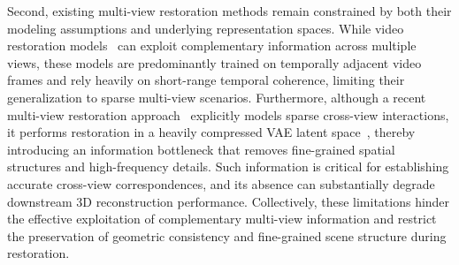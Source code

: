 \documentclass{llmxive}
\begin{document}
Second, existing multi-view restoration methods remain constrained by both their modeling assumptions and underlying representation spaces. While video restoration models~\cite{liang2024vrt, Youk_2024_CVPR} can exploit complementary information across multiple views, these models are predominantly trained on temporally adjacent video frames and rely heavily on short-range temporal coherence, limiting their generalization to sparse multi-view scenarios. Furthermore, although a recent multi-view restoration approach~\cite{mao2025sir} explicitly models sparse cross-view interactions, it performs restoration in a heavily compressed VAE latent space~\cite{kingma2013auto}, thereby introducing an information bottleneck that removes fine-grained spatial structures and high-frequency details. Such information is critical for establishing accurate cross-view correspondences, and its absence can substantially degrade downstream 3D reconstruction performance. Collectively, these limitations hinder the effective exploitation of complementary multi-view information and restrict the preservation of geometric consistency and fine-grained scene structure during restoration.


\end{document}
